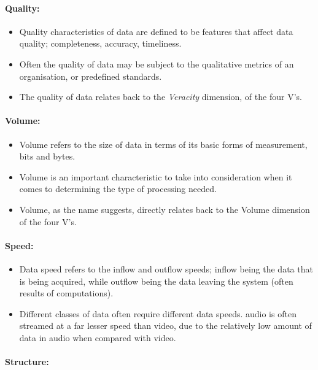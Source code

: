 \documentclass[a4paper,11pt]{article}
\begin{document}
\paragraph{Quality:}

\begin{itemize}
  \item Quality characteristics of data are defined to be features that affect data quality; \eg{}completeness, accuracy,
  timeliness.
  \item Often the quality of data may be subject to the qualitative metrics of an organisation, or predefined standards.
  \item The quality of data relates back to the \emph{Veracity} dimension, of the four V's.
\end{itemize}


\paragraph{Volume:}

\begin{itemize}
  \item Volume refers to the size of data in terms of its basic forms of measurement, bits and bytes.
  \item Volume is an important characteristic to take into consideration when it comes to determining the type of
  processing needed.
  \item Volume, as the name suggests, directly relates back to the Volume dimension of the four V's.
\end{itemize}


\paragraph{Speed:}

\begin{itemize}
  \item Data speed refers to the inflow and outflow speeds; inflow being the data that is being acquired, while outflow
  being the data leaving the system (often results of computations).
  \item Different classes of data often require different data speeds. \eg{}audio is often streamed at a far lesser speed
  than video, due to the relatively low amount of data in audio when compared with video.
\end{itemize}


\paragraph{Structure:}
\end{document}
